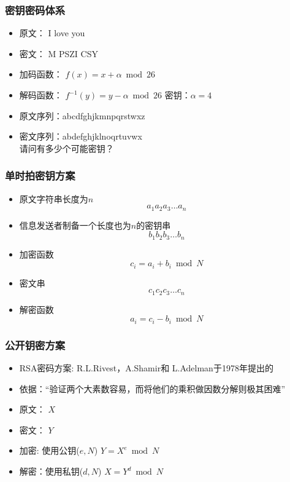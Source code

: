 \begin{frame}
    \frametitle{密钥密码体系}
    \begin{itemize}
        \item  原文： I love you
        \item  密文： M PSZI CSY
        \item  加码函数： $f(x)=x+\alpha \bmod 26$
        \item  解码函数： $f^{-1}(y)=y-\alpha \bmod 26$
        \Item  密钥：$\alpha=4$ \\
        \item  原文序列：abcd{\color{red}{e}}fgh{\color{red}{i}}jk{\color{red}{l}}mn{\color{red}{o}}pqrst{\color{red}{u}}{\color{red}{v}}wx{\color{red}{y}}z \\
        \item  密文序列：ab{\color{green}{c}}defgh{\color{green}{i}}jkl{\color{green}{m}}no{\color{green}{p}}qr{\color{green}{s}}tuvwx{\color{green}{y}}{\color{green}{z}} \\ \vspace{1em}
        请问有多少个可能密钥？
    \end{itemize}
\end{frame}

\begin{frame}
    \frametitle{单时拍密钥方案}
    \begin{itemize}
        \item 原文字符串长度为$n$ \[ a_1a_2a_3\ldots a_n\]
        \item 信息发送者制备一个长度也为$n$的密钥串 \[ b_1b_2b_3\ldots b_n\]
        \item 加密函数 \[ c_i=a_i+b_i \bmod N \]
        \item 密文串 \[ c_1c_2c_3\ldots c_n\]
        \item 解密函数 \[ a_i=c_i-b_i \bmod N \]
    \end{itemize}
\end{frame}

\begin{frame}
    \frametitle{公开钥密方案}
    \begin{itemize}
        \item RSA密码方案: R.L.Rivest，A.Shamir和 L.Adelman于1978年提出的
        \item 依据：“验证两个大素数容易，而将他们的乘积做因数分解则极其困难” 
        \item 原文： $X$
        \item 密文： $Y$
        \item 加密: 使用公钥($e,N$) $Y=X^{e} \bmod N$
        \item 解密：使用私钥($d,N$) $X=Y^{d} \bmod N$
    \end{itemize}
\end{frame}

